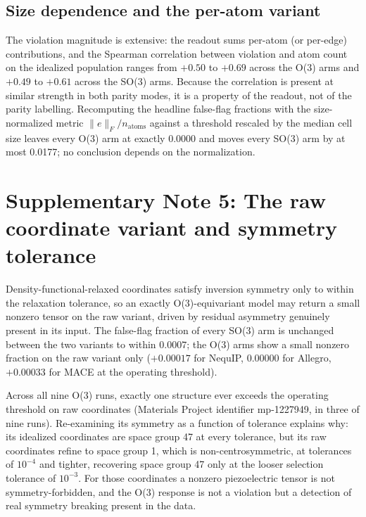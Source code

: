 \subsection*{Size dependence and the per-atom variant}

The violation magnitude is extensive: the readout sums per-atom (or per-edge) contributions, and the Spearman correlation between violation and atom count on the idealized population ranges from $+0.50$ to $+0.69$ across the O(3) arms and $+0.49$ to $+0.61$ across the SO(3) arms. Because the correlation is present at similar strength in both parity modes, it is a property of the readout, not of the parity labelling. Recomputing the headline false-flag fractions with the size-normalized metric $\lVert e \rVert_F / n_{\mathrm{atoms}}$ against a threshold rescaled by the median cell size leaves every O(3) arm at exactly 0.0000 and moves every SO(3) arm by at most 0.0177; no conclusion depends on the normalization.

\section*{Supplementary Note 5: The raw coordinate variant and symmetry tolerance}

Density-functional-relaxed coordinates satisfy inversion symmetry only to within the relaxation tolerance, so an exactly O(3)-equivariant model may return a small nonzero tensor on the raw variant, driven by residual asymmetry genuinely present in its input. The false-flag fraction of every SO(3) arm is unchanged between the two variants to within $0.0007$; the O(3) arms show a small nonzero fraction on the raw variant only ($+0.00017$ for NequIP, $0.00000$ for Allegro, $+0.00033$ for MACE at the operating threshold).

Across all nine O(3) runs, exactly one structure ever exceeds the operating threshold on raw coordinates (Materials Project identifier mp-1227949, in three of nine runs). Re-examining its symmetry as a function of tolerance explains why: its idealized coordinates are space group 47 at every tolerance, but its raw coordinates refine to space group 1, which is non-centrosymmetric, at tolerances of $10^{-4}$ and tighter, recovering space group 47 only at the looser selection tolerance of $10^{-3}$. For those coordinates a nonzero piezoelectric tensor is not symmetry-forbidden, and the O(3) response is not a violation but a detection of real symmetry breaking present in the data.

